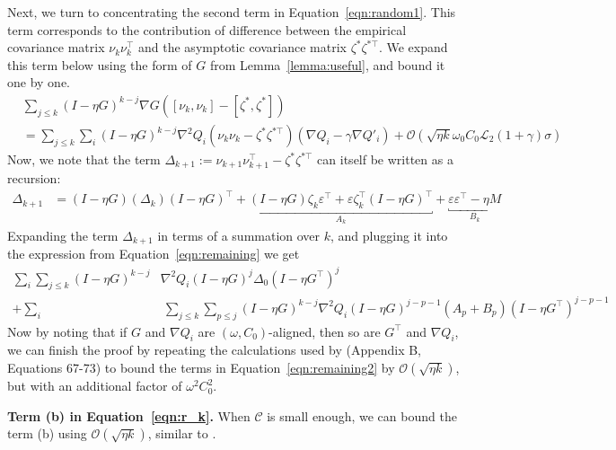 Next, we turn to concentrating the second term in Equation~\ref{eqn:random1}. This term corresponds to the contribution of difference between the empirical covariance matrix  $\nu_k \nu_k^\top$ and the asymptotic covariance matrix $\zeta^* \zeta^{* \top}$. We expand this term below using the form of $G$ from Lemma~\ref{lemma:useful}, and bound it one by one.
\begin{align}
    &\sum_{j \leq k} (I - \eta G)^{k - j} \nabla G ([\nu_k, \nu_k] - [\zeta^*, \zeta^*])\\
    & = \sum_{j \leq k} \sum_i (I - \eta G)^{k-j} \nabla^2 Q_i \left(\nu_k \nu_k - \zeta^* \zeta^{* \top}\right) (\nabla Q_i - \gamma \nabla Q'_i) + \mathcal{O}\left(\sqrt{\eta k} \omega_0 C_0 \mathscr{L}_2 (1 + \gamma) \sigma \right)
    \label{eqn:remaining}
\end{align}
Now, we note that the term $\Delta_{k+1} := \nu_{k+1} \nu_{k+1}^\top - \zeta^* \zeta^{* \top}$ can itself be written as a recursion:
\begin{align}
    \Delta_{k+1} &= (I - \eta G) (\Delta_k) (I - \eta G)^\top + \underbracket{(I - \eta G) \zeta_k \varepsilon^\top  + \varepsilon \zeta_k^\top (I - \eta G)^\top}_{A_k} + \underbracket{\varepsilon \varepsilon^\top - \eta M}_{B_k}     
\end{align}
Expanding the term $\Delta_{k+1}$ in terms of a summation over $k$, and plugging it into the expression from Equation~\ref{eqn:remaining} we get
\begin{align}
\label{eqn:remaining2}
    \sum_{i} \sum_{j \leq k} (I - \eta G)^{k-j} & \nabla^2 Q_i (I - \eta G)^j \Delta_0 (I - \eta G^\top)^j \\ 
    + \sum_i &~ \sum_{j \leq k} \sum_{p \leq j} (I - \eta G)^{k-j} \nabla^2 Q_i (I - \eta G)^{j-p-1} (A_p + B_p) (I - \eta G^\top)^{j-p-1} \nonumber
\end{align}
Now by noting that if $G$ and $\nabla Q_i$ are $(\omega, C_0)$-aligned, then so are $G^\top$ and $\nabla Q_i$, we can finish the proof by repeating the calculations used by \citet{damian2021label} (Appendix B, Equations 67-73) to bound the terms in Equation~\ref{eqn:remaining2} by $\mathcal{O}(\sqrt{\eta k})$, but with an additional factor of $\omega^2 C_0^2$.  

\textbf{Term (b) in Equation~\ref{eqn:r_k}.} When $\mathscr{C}$ is small enough, we can bound the term (b) using $\mathcal{O}(\sqrt{\eta k})$, similar to \citet{damian2021label}.  

